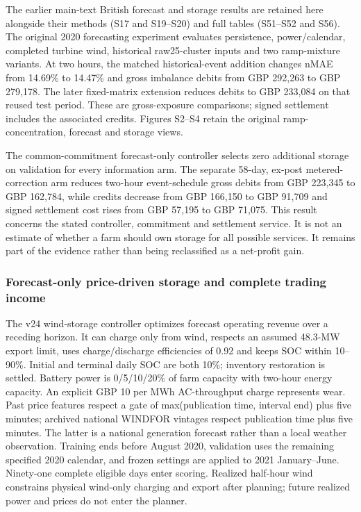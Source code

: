 \documentclass[a4paper,11pt]{article}
\begin{document}
The earlier main-text British forecast and storage results are retained here alongside their methods (S17 and S19--S20) and full tables (S51--S52 and S56). The original 2020 forecasting experiment evaluates persistence, power/calendar, completed turbine wind, historical raw25-cluster inputs and two ramp-mixture variants. At two hours, the matched historical-event addition changes nMAE from 14.69\% to 14.47\% and gross imbalance debits from GBP 292,263 to GBP 279,178. The later fixed-matrix extension reduces debits to GBP 233,084 on that reused test period. These are gross-exposure comparisons; signed settlement includes the associated credits. Figures S2--S4 retain the original ramp-concentration, forecast and storage views.

The common-commitment forecast-only controller selects zero additional storage on validation for every information arm. The separate 58-day, ex-post metered-correction arm reduces two-hour event-schedule gross debits from GBP 223,345 to GBP 162,784, while credits decrease from GBP 166,150 to GBP 91,709 and signed settlement cost rises from GBP 57,195 to GBP 71,075. This result concerns the stated controller, commitment and settlement service. It is not an estimate of whether a farm should own storage for all possible services. It remains part of the evidence rather than being reclassified as a net-profit gain.

\subsubsection{Forecast-only price-driven storage and complete trading income}\label{forecast-only-price-driven-storage-and-complete-trading-income}

The v24 wind-storage controller optimizes forecast operating revenue over a receding horizon. It can charge only from wind, respects an assumed 48.3-MW export limit, uses charge/discharge efficiencies of 0.92 and keeps SOC within 10--90\%. Initial and terminal daily SOC are both 10\%; inventory restoration is settled. Battery power is 0/5/10/20\% of farm capacity with two-hour energy capacity. An explicit GBP 10 per MWh AC-throughput charge represents wear. Past price features respect a gate of max(publication time, interval end) plus five minutes; archived national WINDFOR vintages respect publication time plus five minutes. The latter is a national generation forecast rather than a local weather observation. Training ends before August 2020, validation uses the remaining specified 2020 calendar, and frozen settings are applied to 2021 January--June. Ninety-one complete eligible days enter scoring. Realized half-hour wind constrains physical wind-only charging and export after planning; future realized power and prices do not enter the planner.
\end{document}
